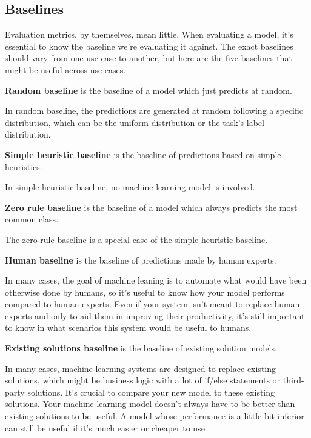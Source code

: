 \subsection{Baselines}

Evaluation metrics, by themselves, mean little. When evaluating a model, it's essential to know the baseline we're
evaluating it against. The exact baselines should vary from one use case to another, but here are the five baselines
that might be useful across use cases.

\textbf{Random baseline} is the baseline of a model which just predicts at random.
\ed

In random baseline, the predictions are generated at random following a specific distribution, which can be the
uniform distribution or the task's label distribution.

\textbf{Simple heuristic baseline} is the baseline of predictions based on simple heuristics.
\ed

In simple heuristic baseline, no machine learning model is involved.

\textbf{Zero rule baseline} is the baseline of a model which always predicts the most common class.
\ed

The zero rule baseline is a special case of the simple heuristic baseline.

\textbf{Human baseline} is the baseline of predictions made by human experts.
\ed

In many cases, the goal of machine leaning is to automate what would have been otherwise done by humans, so it's
useful to know how your model performs compared to human experts. Even if your system isn't meant to replace human
experts and only to aid them in improving their productivity, it's still important to know in what scenarios this
system would be useful to humans.

\textbf{Existing solutions baseline} is the baseline of existing solution models.
\ed

In many cases, machine learning systems are designed to replace existing solutions, which might be business logic
with a lot of if/else statements or third-party solutions. It's crucial to compare your new model to these existing
solutions. Your machine learning model doesn't always have to be better than existing solutions to be useful. A model
whose performance is a little bit inferior can still be useful if it's much easier or cheaper to use.

